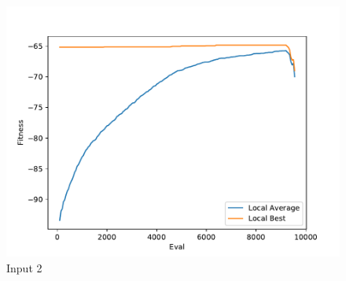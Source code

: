 \documentclass{standalone}
\begin{document}
\begin{figure}[!htb]
	\caption{Input 2}
	\label{fig:graph_2031}
	\includegraphics[width=\textwidth]{../graphs/graphs/2031.pdf}
\end{figure}
\end{document}
